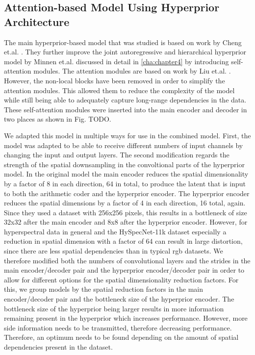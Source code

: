 \subsection{Attention-based Model Using Hyperprior Architecture}
The main hyperprior-based model that was studied is based on work by Cheng et.al. \citep{cheng_learned_2020}. They further improve the joint autoregressive and hierarchical hyperprior model by Minnen et.al. \citep{minnen_joint_2018} discussed in detail in \autoref{cha:chapter4} by introducing self-attention modules. The attention modules are based on work by Liu et.al. \citep{liu_non-local_2019}. However, the non-local blocks have been removed in order to simplify the attention modules. This allowed them to reduce the complexity of the model while still being able to adequately capture long-range dependencies in the data. These self-attention modules were inserted into the main encoder and decoder in two places as shown in Fig. TODO.

We adapted this model in multiple ways for use in the combined model. First, the model was adapted to be able to receive different numbers of input channels by changing the input and output layers. The second modification regards the strength of the spatial downsampling in the convoltional parts of the hyperprior model. In the original model the main encoder reduces the spatial dimensionality by a factor of 8 in each direction, 64 in total, to produce the latent that is input to both the arithmetic coder and the hyperprior encoder. The hyperprior encoder reduces the spatial dimensions by a factor of 4 in each direction, 16  total, again. Since they used a dataset with 256x256 pixels, this results in a bottleneck of size 32x32 after the main encoder and 8x8 after the hyperprior encoder. However, for hyperspectral data in general and the HySpecNet-11k dataset especially a reduction in spatial dimension with a factor of 64 can result in large distortion, since there are less spatial dependencies than in typical \ac{rgb} datasets. We therefore modified both the numbers of convolutional layers and the strides in the main encoder/decoder pair and the hyperprior encoder/decoder pair in order to allow for different options for the spatial dimensionality reduction factors. For this, we group models by the spatial reduction factors in the main encoder/decoder pair and the bottleneck size of the hyperprior encoder. The bottleneck size of the hyperprior being larger results in more information remaining present in the hyperprior which increases performance. However, more side information needs to be transmitted, therefore decreasing performance. Therefore, an optimum needs to be found depending on the amount of spatial dependencies present in the dataset.